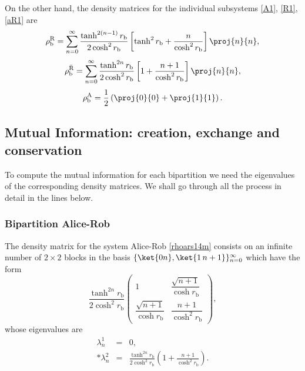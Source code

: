 On the other hand, the density matrices for the individual subsystems \eqref{A1}, \eqref{R1},\eqref{aR1} are
\begin{equation}\label{Robpartialm4}
\rho^{\text{R}}_\text{b}=\sum_{n=0}^\infty\frac{\tanh^{2(n-1)}r_\text{b}}{2\cosh^2 r_\text{b}}\left[\tanh^2 r_\text{b}+\frac{n}{\cosh^2r_\text{b}}\right]\proj{n}{n},
\end{equation}
\begin{equation}\label{ARobpartialm4}
\rho^{{\bar{\text{R}}}}_\text{b}=\sum_{n=0}^\infty\frac{\tanh^{2n}r_\text{b}}{2\cosh^2 r_\text{b}}\left[1+\frac{n+1}{\cosh^2r_\text{b}}\right]\proj{n}{n},
\end{equation}
\begin{equation}\label{AlicedeAliceRobm4}
\rho^{\text{A}}_\text{b}=\frac12\left(\proj{0}{0}+\proj{1}{1}\right).
\end{equation}

\subsection{Mutual Information: creation, exchange and conservation}


To compute the mutual information  for each bipartition we need the eigenvalues of the corresponding density matrices. We shall go through all the process in detail in the lines below.

\subsubsection{Bipartition Alice-Rob}

The density matrix for the system Alice-Rob \eqref{rhoars14m}  consists on an infinite number of $2\times2$ blocks in the basis $\{\ket{0 n},\ket{1\, n+1}\}_{n=0}^\infty$ which have the form
\begin{equation}
\frac{\tanh^{2n}r_\text{b}}{2\cosh^2 r_\text{b}}
\left(\!\begin{array}{cc}
1 & \dfrac{\sqrt{n+1}}{\cosh r_\text{b}}\\
\dfrac{\sqrt{n+1}}{\cosh r_\text{b}} & \dfrac{n+1}{\cosh^2r_\text{b}}
\end{array}\!\right),
\end{equation}
whose eigenvalues are
\begin{eqnarray}\label{eigAR4m}
\nonumber\lambda^1_n&=&0,\\*
\lambda^2_n&=&\frac{\tanh^{2n}r_\text{b}}{2\cosh^2 r_\text{b}}\left(1+\frac{n+1}{\cosh^2 r_\text{b}}\right).
\end{eqnarray}

